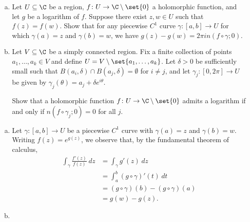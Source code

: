 \documentclass[10pt]{mypackage}
\begin{document}
\begin{problem}[Problem 5]\hfill
  \begin{enumerate}[(a)]
    \item Let $U\subseteq \C$ be a region, $f\colon U\rightarrow \C\setminus \set{0}$ a holomorphic function, and let $g$ be a logarithm of $f$. Suppose there exist $z,w\in U$ such that $f(z) = f(w)$. Show that for any piecewise $C^{1}$ curve $\gamma\colon [a,b]\rightarrow U$ for which $\gamma(a) = z$ and $\gamma(b) = w$, we have $g(z) - g(w) = 2\pi i n \left( f\circ\gamma;0 \right)$.
    \item Let $V\subseteq \C$ be a simply connected region. Fix a finite collection of points $a_1,\dots,a_k\in V$ and define $U = V\setminus \set{a_1,\dots,a_k}$. Let $\delta > 0$ be sufficiently small such that $ B\left( a_i,\delta \right)\cap B\left( a_j,\delta \right) = \emptyset $ for $i\neq j$, and let $\gamma_j\colon [0,2\pi]\rightarrow U$ be given by $\gamma_j\left( \theta \right)= a_j + \delta e^{i\theta}$.\newline

      Show that a holomorphic function $f\colon U\rightarrow \C\setminus \set{0}$ admits a logarithm if and only if $n\left( f\circ\gamma_j;0 \right) = 0$ for all $j$.
  \end{enumerate}
\end{problem}
\begin{solution}\hfill
  \begin{enumerate}[(a)]
    \item Let $\gamma\colon [a,b]\rightarrow U$ be a piecewise $C^{1}$ curve with $\gamma(a) = z$  and $\gamma(b) = w$. Writing $f(z) = e^{g(z)}$, we observe that, by the fundamental theorem of calculus,
      \begin{align*}
        \int_{\gamma}^{} \frac{f'(z)}{f(z)}\:dz &= \int_{\gamma}^{} g'(z)\:dz\\
                                                &= \int_{a}^{b} \left( g\circ\gamma \right)'(t)\:dt\\
                                                &= \left( g\circ\gamma \right)(b) - \left( g\circ\gamma \right)(a)\\
                                                &= g(w)-g(z).
      \end{align*}
    \item 
  \end{enumerate}
\end{solution}
\end{document}
